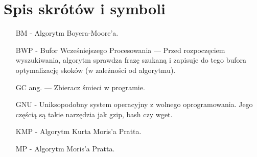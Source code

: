 \chapter{Spis skrótów i symboli}

\begin{itemize}
\item[BM] - Algorytm Boyera-Moore'a.
\item[BWP] - Bufor Wcześniejszego Procesowania — Przed rozpoczęciem wyszukiwania, algorytm sprawdza frazę szukaną i zapisuje do tego bufora
optymalizację skoków (w zależności od algorytmu).
\item[GC] ang.  — Zbieracz śmieci w programie.
\item[GNU] - Uniksopodobny system operacyjny z wolnego oprogramowania. Jego 
częścią są takie narzędzia jak gzip, bash czy wget.
\item[KMP] - Algorytm Kurta Moris'a Pratta.
\item[MP] - Algorytm Moris'a Pratta.
\end{itemize}